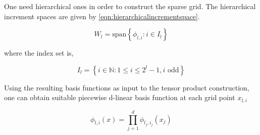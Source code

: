 One need hierarchical ones in order to construct the sparse grid. The hierarchical increment spaces are given by \cref{eqn:hierarchicalincrementspace}.

\begin{equation}
    W_l = \text{span} \left\{ \phi_{l,i} : i \in I_l\right\}
    \label{eqn:hierarchicalincrementspace}
\end{equation}

where the index set is,

\begin{equation}
    I_l = \left\{ i \in \mathbb{N}: 1 \leq i \leq 2^l-1 , i \text{ odd} \right\}
\end{equation}

Using the resulting basis functions as input to the tensor product construction, one can obtain suitable piecewise d-linear basis function at each grid point \(x_{l,i}\)

\begin{equation}
    \phi_{l,i}(x) = \prod_{j=1}^d \phi_{l_j,i_j}(x_j)
\end{equation}